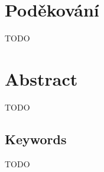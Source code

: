 \openright
\vspace*{\fill}
\section*{Poděkování}
TODO
\noindent
\Podekovani
\vspace{1cm}


\openright

\section*{Abstract}
TODO
\noindent
\AbstraktEN
\subsection*{Keywords}
TODO
\noindent
\KlicovaSlovaEN

\openright
